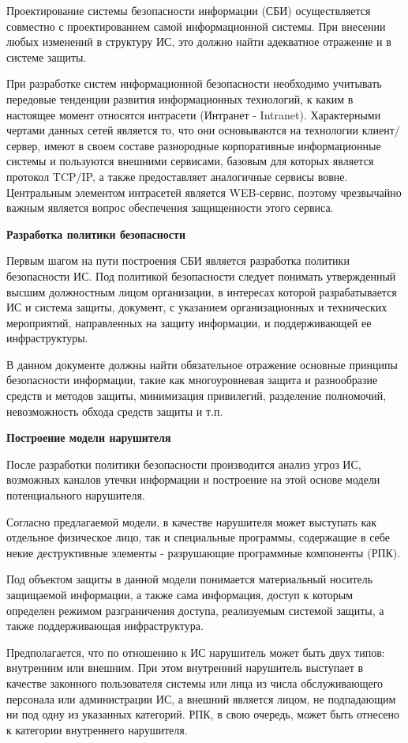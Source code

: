 Проектирование системы безопасности информации (СБИ) осуществляется совместно с проектированием самой информационной системы.
При внесении любых изменений в структуру ИС, это должно найти адекватное отражение и в системе защиты.

При разработке систем информационной безопасности необходимо учитывать передовые тенденции развития информационных
технологий, к каким в настоящее момент относятся интрасети (Интранет - Intranet).
Характерными чертами данных сетей является то, что они основываются на технологии клиент/сервер, имеют в своем составе
разнородные корпоративные информационные системы и пользуются внешними сервисами, базовым для которых является
протокол TCP/IP, а также предоставляет аналогичные сервисы вовне. Центральным элементом интрасетей является
WEB-сервис, поэтому чрезвычайно важным является вопрос обеспечения защищенности этого сервиса.

\bigbreak
\textbf{Разработка политики безопасности}

Первым шагом на пути построения СБИ является разработка политики безопасности ИС.
Под политикой безопасности следует понимать утвержденный высшим должностным лицом организации, в
интересах которой разрабатывается ИС и система защиты, документ, с указанием организационных и технических мероприятий,
направленных на защиту информации, и поддерживающей ее инфраструктуры.

В данном документе должны найти обязательное отражение основные принципы безопасности информации,
такие как многоуровневая защита и разнообразие средств и методов защиты, минимизация привилегий, разделение полномочий,
невозможность обхода средств защиты и т.п.

\bigbreak
\textbf{Построение модели нарушителя}

После разработки политики безопасности производится анализ угроз ИС, возможных каналов утечки информации и
построение на этой основе модели потенциального нарушителя.

Согласно предлагаемой модели, в качестве нарушителя может выступать как отдельное физическое лицо,
так и специальные программы, содержащие в себе некие деструктивные элементы - разрушающие программные компоненты (РПК).

Под объектом защиты в данной модели понимается материальный носитель защищаемой информации, а также сама информация,
доступ к которым определен режимом разграничения доступа, реализуемым системой защиты, а также поддерживающая инфраструктура.

Предполагается, что по отношению к ИС нарушитель может быть двух типов: внутренним или внешним.
При этом внутренний нарушитель выступает в качестве законного пользователя системы или лица из числа
обслуживающего персонала или администрации ИС, а внешний является лицом, не подпадающим ни под
одну из указанных категорий. РПК, в свою очередь, может быть отнесено к категории внутреннего нарушителя.

